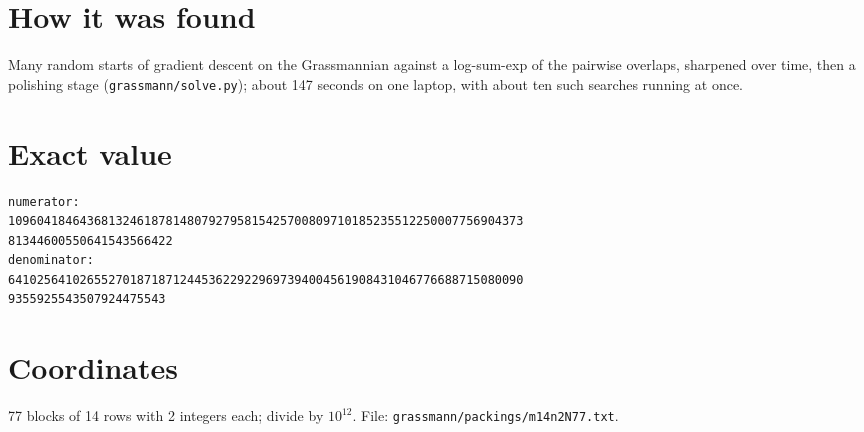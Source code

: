 \documentclass[11pt,a4paper]{article}
\begin{document}
\section{How it was found}
Many random starts of gradient descent on the Grassmannian against a log-sum-exp of the pairwise overlaps, sharpened over time, then a polishing stage (\texttt{grassmann/solve.py}); about 147 seconds on one laptop, with about ten such searches running at once.


\appendix
\section{Exact value}
{\small
\begin{verbatim}
numerator:
109604184643681324618781480792795815425700809710185235512250007756904373
81344600550641543566422
denominator:
641025641026552701871871244536229229697394004561908431046776688715080090
9355925543507924475543
\end{verbatim}}

\section{Coordinates}
77 blocks of 14 rows with 2 integers each; divide by $10^{12}$. File: \texttt{grassmann/packings/m14n2N77.txt}.
{\tiny
\begin{multicols}{4}
\end{multicols}}
\end{document}
